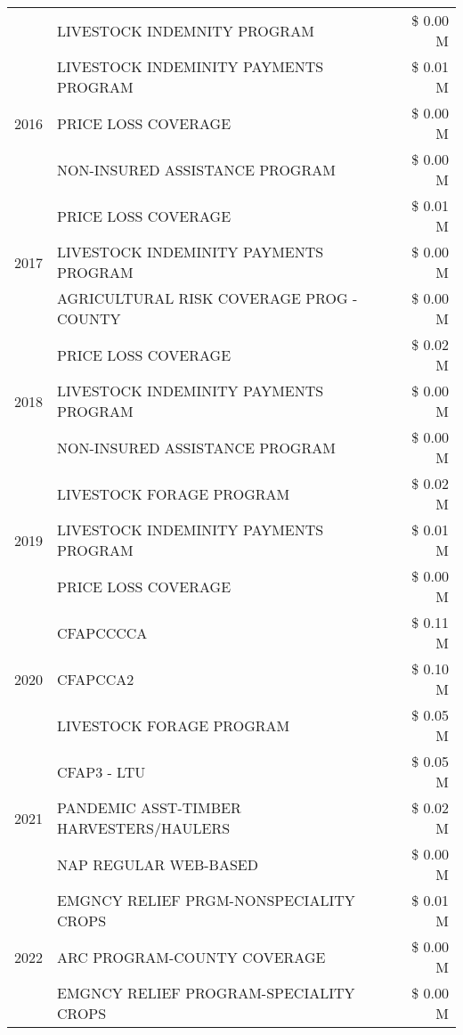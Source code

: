 \begin{tabular}{llr}
 & LIVESTOCK INDEMNITY PROGRAM & \$ 0.00 M \\
\cline{1-3}
\multirow[t]{3}{*}{2016} & LIVESTOCK INDEMINITY PAYMENTS PROGRAM & \$ 0.01 M \\
 & PRICE LOSS COVERAGE & \$ 0.00 M \\
 & NON-INSURED ASSISTANCE PROGRAM & \$ 0.00 M \\
\cline{1-3}
\multirow[t]{3}{*}{2017} & PRICE LOSS COVERAGE & \$ 0.01 M \\
 & LIVESTOCK INDEMINITY PAYMENTS PROGRAM & \$ 0.00 M \\
 & AGRICULTURAL RISK COVERAGE PROG - COUNTY & \$ 0.00 M \\
\cline{1-3}
\multirow[t]{3}{*}{2018} & PRICE LOSS COVERAGE & \$ 0.02 M \\
 & LIVESTOCK INDEMINITY PAYMENTS PROGRAM & \$ 0.00 M \\
 & NON-INSURED ASSISTANCE PROGRAM & \$ 0.00 M \\
\cline{1-3}
\multirow[t]{3}{*}{2019} & LIVESTOCK FORAGE PROGRAM & \$ 0.02 M \\
 & LIVESTOCK INDEMINITY PAYMENTS PROGRAM & \$ 0.01 M \\
 & PRICE LOSS COVERAGE & \$ 0.00 M \\
\cline{1-3}
\multirow[t]{3}{*}{2020} & CFAPCCCCA & \$ 0.11 M \\
 & CFAPCCA2 & \$ 0.10 M \\
 & LIVESTOCK FORAGE PROGRAM & \$ 0.05 M \\
\cline{1-3}
\multirow[t]{3}{*}{2021} & CFAP3 - LTU & \$ 0.05 M \\
 & PANDEMIC ASST-TIMBER HARVESTERS/HAULERS & \$ 0.02 M \\
 & NAP REGULAR WEB-BASED & \$ 0.00 M \\
\cline{1-3}
\multirow[t]{3}{*}{2022} & EMGNCY RELIEF PRGM-NONSPECIALITY CROPS & \$ 0.01 M \\
 & ARC PROGRAM-COUNTY COVERAGE & \$ 0.00 M \\
 & EMGNCY RELIEF PROGRAM-SPECIALITY CROPS & \$ 0.00 M \\
\cline{1-3}
\bottomrule
\end{tabular}
